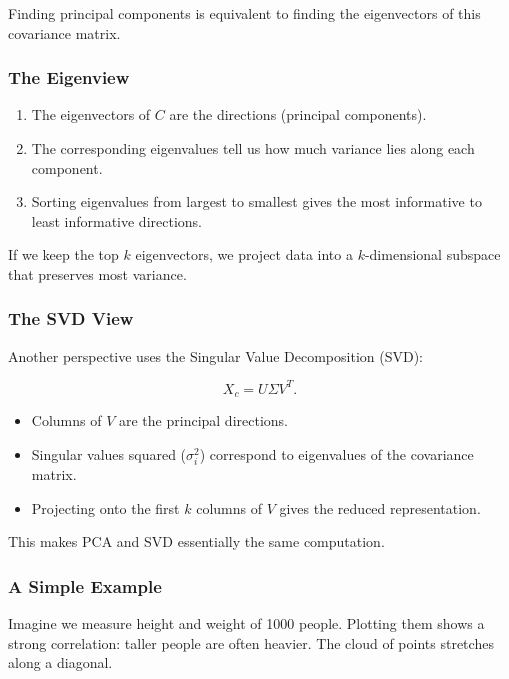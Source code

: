 \documentclass[
  letterpaper,
  DIV=11,
  numbers=noendperiod]{scrreprt}
\providecommand{\tightlist}{%
  \setlength{\itemsep}{0pt}\setlength{\parskip}{0pt}}
\begin{document}
Finding principal components is equivalent to finding the eigenvectors
of this covariance matrix.

\subsubsection{The Eigenview}\label{the-eigenview}

\begin{enumerate}
\def\labelenumi{\arabic{enumi}.}
\tightlist
\item
  The eigenvectors of \(C\) are the directions (principal components).
\item
  The corresponding eigenvalues tell us how much variance lies along
  each component.
\item
  Sorting eigenvalues from largest to smallest gives the most
  informative to least informative directions.
\end{enumerate}

If we keep the top \(k\) eigenvectors, we project data into a
\(k\)-dimensional subspace that preserves most variance.

\subsubsection{The SVD View}\label{the-svd-view}

Another perspective uses the Singular Value Decomposition (SVD):

\[
X_c = U \Sigma V^T.
\]

\begin{itemize}
\tightlist
\item
  Columns of \(V\) are the principal directions.
\item
  Singular values squared (\(\sigma_i^2\)) correspond to eigenvalues of
  the covariance matrix.
\item
  Projecting onto the first \(k\) columns of \(V\) gives the reduced
  representation.
\end{itemize}

This makes PCA and SVD essentially the same computation.

\subsubsection{A Simple Example}\label{a-simple-example-1}

Imagine we measure height and weight of 1000 people. Plotting them shows
a strong correlation: taller people are often heavier. The cloud of
points stretches along a diagonal.
\end{document}

